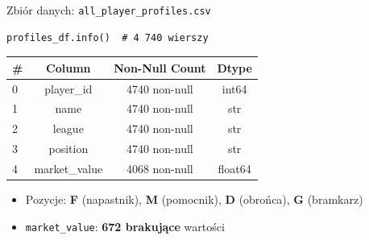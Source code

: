 \documentclass[aspectratio=169]{beamer}
\begin{document}
\begin{frame}[fragile]{Zbiór danych: \texttt{all\_player\_profiles.csv}}

    \begin{lstlisting}
profiles_df.info()  # 4 740 wierszy
    \end{lstlisting}

    \begin{tabular}{lccc}
        \toprule
        \textbf{\#} & \textbf{Column} & \textbf{Non-Null Count} & \textbf{Dtype} \\
        \midrule
        0 & player\_id & 4740 non-null & int64 \\
        1 & name & 4740 non-null & str \\
        2 & league & 4740 non-null & str \\
        3 & position & 4740 non-null & str \\
        4 & market\_value & 4068 non-null & float64 \\
        \bottomrule
    \end{tabular}

    \vspace{0.3cm}
    \begin{itemize}
        \item Pozycje: \textbf{F} (napastnik), \textbf{M} (pomocnik), \textbf{D} (obrońca), \textbf{G} (bramkarz)
        \item \texttt{market\_value}: \textbf{672 brakujące} wartości
    \end{itemize}
\end{frame}
\end{document}

